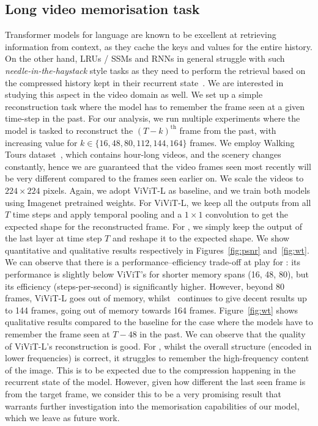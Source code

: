 \subsection{Long video memorisation task}
\label{sec:longtask}

Transformer models for language are known to be excellent at retrieving information from context, as they cache the keys and values for the entire history. On the other hand, LRUs / SSMs and RNNs in general struggle with such \emph{needle-in-the-haystack} style tasks as they need to perform the retrieval based on the compressed history kept in their recurrent state~\cite{jelassi2024repeat, de2024griffinmixinggatedlinear}. 
We are interested in studying this aspect in the video domain as well. We set up a simple reconstruction task where the model has to remember the frame seen at a given time-step in the past. For our analysis, we run multiple experiments where the model is tasked to reconstruct the $(T-k)^{\text{th}}$ frame from the past, with increasing value for $k\in\{16, 48, 80, 112, 144, 164\}$ frames. We employ Walking Tours dataset~\cite{venkataramanan2023imagenet}, which contains hour-long videos, and the scenery changes constantly, hence we are guaranteed that the video frames seen most recently will be very different compared to the frames seen earlier on. We scale the videos to $224\times224$ pixels. Again, we adopt ViViT-L as baseline, and we train both models using Imagenet pretrained weights. For ViViT-L, we keep all the outputs from all $T$ time steps and apply temporal pooling and a $1\times1$ convolution to get the expected shape for the reconstructed frame. For \ssm, we simply keep the output of the last layer at time step $T$ and reshape it to the expected shape. We show quantitative and qualitative results respectively in Figures~\ref{fig:psnr} and~\ref{fig:wt}. We can observe that there is a performance--efficiency trade-off at play for \ssm: its performance is slightly below ViViT's for shorter memory spans (16, 48, 80), but its efficiency (steps-per-second) is significantly higher. However, beyond 80 frames, ViViT-L goes out of memory, whilst \ssm\ continues to give decent results up to 144 frames, going out of memory towards 164 frames. Figure~\ref{fig:wt} shows qualitative results compared to the baseline for the case where the models have to remember the frame seen at $T-48$ in the past. We can observe that the quality of ViViT-L's reconstruction is good. For \ssm, whilst the overall structure (encoded in lower frequencies) is correct, it struggles to remember the high-frequency content of the image. This is to be expected due to the compression happening in the recurrent state of the model. However, given how different the last seen frame is from the target frame, we consider this to be a very promising result that warrants further investigation into the memorisation capabilities of our model, which we leave as future work.


